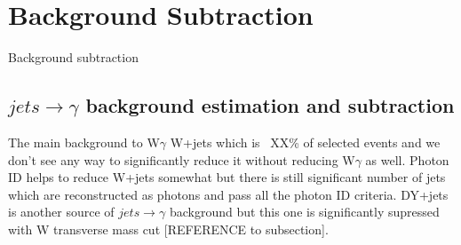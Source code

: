 \section{Background Subtraction}
\label{sec:BackgroundSubtraction}
Background subtraction

\subsection{$jets \rightarrow \gamma$ background estimation and subtraction}
The main background to W$\gamma$  W+jets which is ~XX\% of selected events and we don't see any way to significantly reduce it without reducing W$\gamma$ as well. Photon ID helps to reduce W+jets somewhat but there is still significant number of jets which are reconstructed as photons and pass all the photon ID criteria. DY+jets is another source of $jets \rightarrow \gamma$ background but this one is significantly supressed with W transverse mass cut [REFERENCE to subsection].

